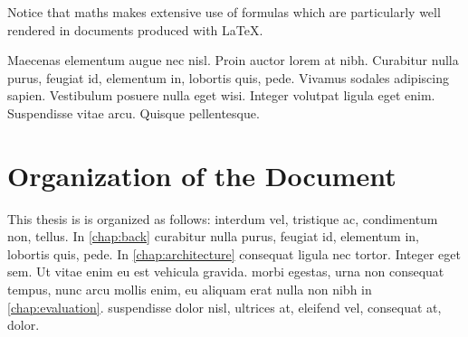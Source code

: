 Notice that \gls{maths} makes extensive use of \Glspl{formula} which are particularly well rendered in documents produced with \gls{LaTeX}.

Maecenas elementum augue nec nisl. Proin auctor lorem at nibh. Curabitur nulla purus, feugiat id, elementum in, lobortis quis, pede. Vivamus sodales adipiscing sapien. Vestibulum posuere nulla eget wisi. Integer volutpat ligula eget enim. Suspendisse vitae arcu. Quisque pellentesque.
\section{Organization of the Document}
This thesis is is organized as follows:  interdum vel, tristique ac, condimentum non, tellus. 
In \cref{chap:back} curabitur nulla purus, feugiat id, elementum in, lobortis quis, pede.
In \cref{chap:architecture} consequat ligula nec tortor. Integer eget sem. Ut vitae enim eu est vehicula gravida.
 morbi egestas, urna non consequat tempus, nunc arcu mollis enim, eu aliquam erat nulla non nibh in \cref{chap:evaluation}.
 suspendisse dolor nisl, ultrices at, eleifend vel, consequat at, dolor.